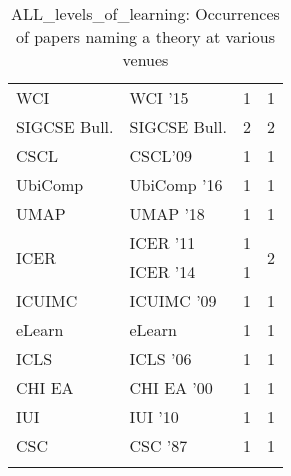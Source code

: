 \begin{table*}[t]
\begin{tabular}{llrr}
\multirow{1}{*}{WCI } & WCI '15 & 1 & \multirow{1}{*}{1}\\
\multirow{1}{*}{SIGCSE Bull.} & SIGCSE Bull. & 2 & \multirow{1}{*}{2}\\
\multirow{1}{*}{CSCL} & CSCL'09 & 1 & \multirow{1}{*}{1}\\
\multirow{1}{*}{UbiComp } & UbiComp '16 & 1 & \multirow{1}{*}{1}\\
\multirow{1}{*}{UMAP } & UMAP '18 & 1 & \multirow{1}{*}{1}\\
\multirow{2}{*}{ICER } & ICER '11 & 1 & \multirow{2}{*}{2}\\
& ICER '14 & 1 &\\
\multirow{1}{*}{ICUIMC } & ICUIMC '09 & 1 & \multirow{1}{*}{1}\\
\multirow{1}{*}{eLearn} & eLearn & 1 & \multirow{1}{*}{1}\\
\multirow{1}{*}{ICLS } & ICLS '06 & 1 & \multirow{1}{*}{1}\\
\multirow{1}{*}{CHI EA } & CHI EA '00 & 1 & \multirow{1}{*}{1}\\
\multirow{1}{*}{IUI } & IUI '10 & 1 & \multirow{1}{*}{1}\\
\multirow{1}{*}{CSC } & CSC '87 & 1 & \multirow{1}{*}{1}\\
\caption{ALL_levels_of_learning: Occurrences of papers naming a theory at various venues}
\end{tabular}
\end{table*}